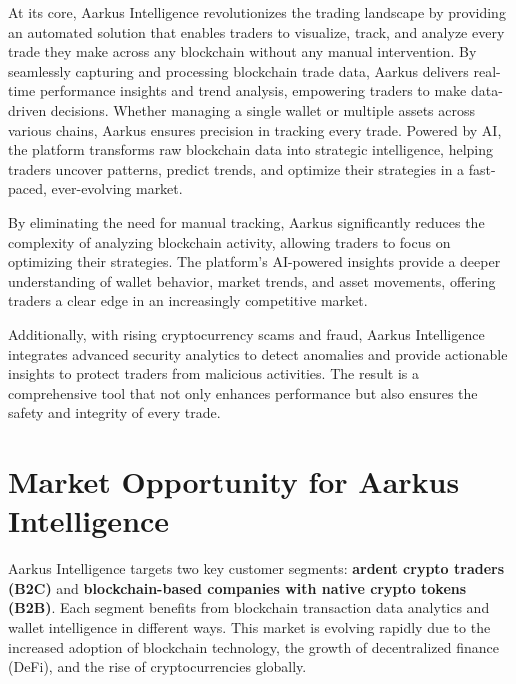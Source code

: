 \documentclass{article}
\begin{document}
  

At its core, Aarkus Intelligence revolutionizes the trading landscape by providing an automated solution that enables traders to visualize, track, and analyze every trade they make across any blockchain without any manual intervention. By seamlessly capturing and processing blockchain trade data, Aarkus delivers real-time performance insights and trend analysis, empowering traders to make data-driven decisions. Whether managing a single wallet or multiple assets across various chains, Aarkus ensures precision in tracking every trade. Powered by AI, the platform transforms raw blockchain data into strategic intelligence, helping traders uncover patterns, predict trends, and optimize their strategies in a fast-paced, ever-evolving market.

By eliminating the need for manual tracking, Aarkus significantly reduces the complexity of analyzing blockchain activity, allowing traders to focus on optimizing their strategies. The platform’s AI-powered insights provide a deeper understanding of wallet behavior, market trends, and asset movements, offering traders a clear edge in an increasingly competitive market.

Additionally, with rising cryptocurrency scams and fraud, Aarkus Intelligence integrates advanced security analytics to detect anomalies and provide actionable insights to protect traders from malicious activities. The result is a comprehensive tool that not only enhances performance but also ensures the safety and integrity of every trade.

\section{Market Opportunity for Aarkus Intelligence}

Aarkus Intelligence targets two key customer segments: \textbf{ardent crypto traders (B2C)} and \textbf{blockchain-based companies with native crypto tokens (B2B)}. Each segment benefits from blockchain transaction data analytics and wallet intelligence in different ways. This market is evolving rapidly due to the increased adoption of blockchain technology, the growth of decentralized finance (DeFi), and the rise of cryptocurrencies globally.
\end{document}
